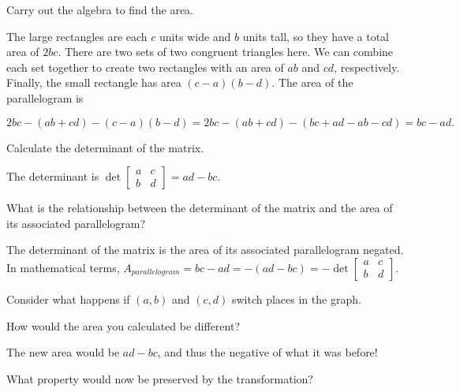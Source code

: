 \documentclass[../gatm_answers.tex]{subfiles}
\begin{document}
\begin{iinner_problem}
\begin{iinner_problem}
\begin{iinner_problem}
\begin{inner_problem}
\item Carry out the algebra to find the area.
\end{inner_problem}

The large rectangles are each $c$ units wide and $b$ units tall, so they have a total area of $2bc$. There are two sets of two congruent triangles here. We can combine each set together to create two rectangles with an area of $ab$ and $cd$, respectively. Finally, the small rectangle has area $(c-a)(b-d)$. The area of the parallelogram is

$$2bc-(ab+cd)-(c-a)(b-d) = 2bc-(ab+cd) - (bc+ad-ab-cd) = bc-ad.$$

\begin{inner_problem}
\item Calculate the determinant of the matrix.
\end{inner_problem}

The determinant is $\det \begin{bmatrix} a & c \\ b & d \end{bmatrix} =ad-bc$.

\begin{inner_problem}
\item What is the relationship between the determinant of the matrix and the area of its associated parallelogram?
\end{inner_problem}

The determinant of the matrix is the area of its associated parallelogram negated. In mathematical terms, $A_{parallelogram}=bc-ad = -(ad-bc) = -\det \begin{bmatrix} a & c \\ b & d \end{bmatrix}$.

\begin{inner_problem}
\item Consider what happens if $(a,b)$ and $(c,d)$ switch places in the graph.
\end{inner_problem}

\begin{iinner_problem}[start=1]
\item How would the area you calculated be different?
\end{iinner_problem}

The new area would be $ad-bc$, and thus the negative of what it was before!

\begin{iinner_problem}
\item What property would now be preserved by the transformation?
\end{iinner_problem}


\end{iinner_problem}
\end{iinner_problem}
\end{iinner_problem}
\end{document}
